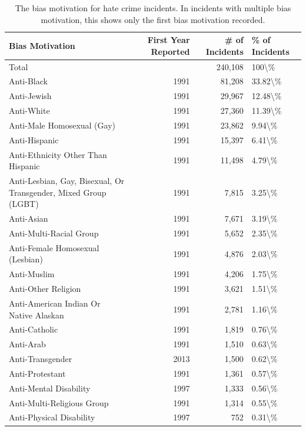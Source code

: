 \documentclass[
  12pt,
  openany]{book}
\begin{document}
\begin{longtable}[t]{lrrl}
\caption{\label{tab:hateBiasMotivation}The bias motivation for hate crime incidents. In incidents with multiple bias motivation, this shows only the first bias motivation recorded.}\\
\toprule
Bias Motivation & First Year Reported & \# of Incidents & \% of Incidents\\
\midrule
Total &  & 240,108 & 100\textbackslash{}\%\\
Anti-Black & 1991 & 81,208 & 33.82\textbackslash{}\%\\
Anti-Jewish & 1991 & 29,967 & 12.48\textbackslash{}\%\\
Anti-White & 1991 & 27,360 & 11.39\textbackslash{}\%\\
Anti-Male Homosexual (Gay) & 1991 & 23,862 & 9.94\textbackslash{}\%\\
\addlinespace
Anti-Hispanic & 1991 & 15,397 & 6.41\textbackslash{}\%\\
Anti-Ethnicity Other Than Hispanic & 1991 & 11,498 & 4.79\textbackslash{}\%\\
Anti-Lesbian, Gay, Bisexual, Or Transgender, Mixed Group (LGBT) & 1991 & 7,815 & 3.25\textbackslash{}\%\\
Anti-Asian & 1991 & 7,671 & 3.19\textbackslash{}\%\\
Anti-Multi-Racial Group & 1991 & 5,652 & 2.35\textbackslash{}\%\\
\addlinespace
Anti-Female Homosexual (Lesbian) & 1991 & 4,876 & 2.03\textbackslash{}\%\\
Anti-Muslim & 1991 & 4,206 & 1.75\textbackslash{}\%\\
Anti-Other Religion & 1991 & 3,621 & 1.51\textbackslash{}\%\\
Anti-American Indian Or Native Alaskan & 1991 & 2,781 & 1.16\textbackslash{}\%\\
Anti-Catholic & 1991 & 1,819 & 0.76\textbackslash{}\%\\
\addlinespace
Anti-Arab & 1991 & 1,510 & 0.63\textbackslash{}\%\\
Anti-Transgender & 2013 & 1,500 & 0.62\textbackslash{}\%\\
Anti-Protestant & 1991 & 1,361 & 0.57\textbackslash{}\%\\
Anti-Mental Disability & 1997 & 1,333 & 0.56\textbackslash{}\%\\
Anti-Multi-Religious Group & 1991 & 1,314 & 0.55\textbackslash{}\%\\
\addlinespace
Anti-Physical Disability & 1997 & 752 & 0.31\textbackslash{}\%\\

\end{longtable}
\end{document}
